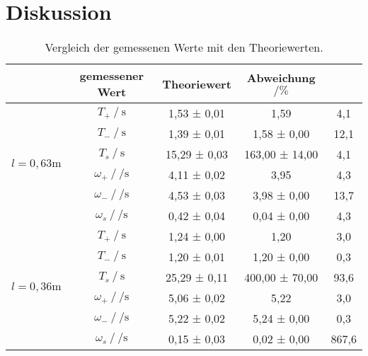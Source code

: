 \section{Diskussion}
\label{sec:Diskussion}

\begin{table}[H]
    \centering
    \caption{Vergleich der gemessenen Werte mit den Theoriewerten.}
    \label{tab:Vergleich}
    \begin{tabular}{c c S S S}
      \toprule
      &{gemessener Wert}&{Theoriewert}&{Abweichung $\mathbin{/} \si{\percent}$}\\
      \midrule
        &{$T_+ \mathbin{/} \si{\second}$} & 1,53 ± 0,01 & 1,59 & 4,1 \\
        &{$T_- \mathbin{/} \si{\second}$} & 1,39 ± 0,01 & 1,58 ± 0,00 & 12,1 \\
        &{$T_s \mathbin{/} \si{\second}$} & 15,29 ± 0,03 & 163,00 ± 14,00 & 4,1\\ 
        &{$\omega_+ \mathbin{/} \si{\per\second}$} & 4,11 ± 0,02 & 3,95 & 4,3\\
        &{$\omega_- \mathbin{/} \si{\per\second}$} & 4,53 ± 0,03 & 3,98 ± 0,00 & 13,7\\
        &{$\omega_s \mathbin{/} \si{\per\second}$} & 0,42 ± 0,04 & 0,04 ± 0,00 & 4,3\\
        \midrule
        &{$T_+ \mathbin{/} \si{\second}$} & 1,24 ± 0,00 & 1,20 & 3,0\\
        &{$T_- \mathbin{/} \si{\second}$} & 1,20 ± 0,01 & 1,20 ± 0,00 & 0,3\\
        &{$T_s \mathbin{/} \si{\second}$} & 25,29 ± 0,11 & 400,00 ± 70,00 & 93,6\\ 
        &{$\omega_+ \mathbin{/} \si{\per\second}$} & 5,06 ± 0,02 & 5,22 & 3,0\\
        &{$\omega_- \mathbin{/} \si{\per\second}$} & 5,22 ± 0,02 & 5,24 ± 0,00 & 0,3 \\
        &{$\omega_s \mathbin{/} \si{\per\second}$} & 0,15 ± 0,03 & 0,02 ± 0,00 & 867,6\\
      \bottomrule
    \end{tabular}
  \end{table}



